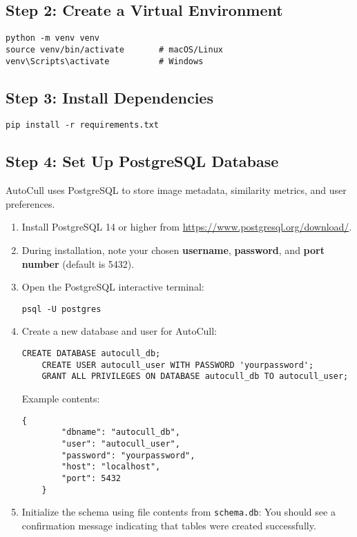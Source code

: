 \documentclass[12pt,a4paper]{article}
\begin{document}
\subsection{Step 2: Create a Virtual Environment}
\begin{lstlisting}[style=console]
python -m venv venv
source venv/bin/activate       # macOS/Linux
venv\Scripts\activate          # Windows
\end{lstlisting}

\subsection{Step 3: Install Dependencies}
\begin{lstlisting}[style=console]
pip install -r requirements.txt
\end{lstlisting}

\subsection{Step 4: Set Up PostgreSQL Database}

AutoCull uses PostgreSQL to store image metadata, similarity metrics, and user preferences.

\begin{enumerate}[label=\arabic*.]
    \item Install PostgreSQL 14 or higher from \url{https://www.postgresql.org/download/}.
    \item During installation, note your chosen \textbf{username}, \textbf{password}, and \textbf{port number} (default is 5432).
    \item Open the PostgreSQL interactive terminal:
    \begin{lstlisting}[style=console]
    psql -U postgres
    \end{lstlisting}
    \item Create a new database and user for AutoCull:
    \begin{lstlisting}[style=console]
    CREATE DATABASE autocull_db;
    CREATE USER autocull_user WITH PASSWORD 'yourpassword';
    GRANT ALL PRIVILEGES ON DATABASE autocull_db TO autocull_user;
    \end{lstlisting}

    Example contents:
    \begin{lstlisting}[style=console]
    {
        "dbname": "autocull_db",
        "user": "autocull_user",
        "password": "yourpassword",
        "host": "localhost",
        "port": 5432
    }
    \end{lstlisting}
    \item Initialize the schema using file contents from \texttt{schema.db}:
    You should see a confirmation message indicating that tables were created successfully.
\end{enumerate}
\end{document}
